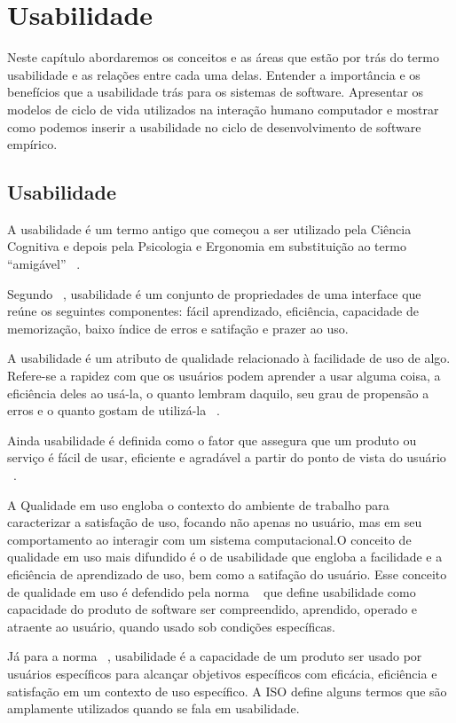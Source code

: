 \chapter{Usabilidade}

	Neste capítulo abordaremos os conceitos e as áreas que estão por trás do termo usabilidade e as relações entre cada uma delas. Entender a importância e os benefícios que a usabilidade trás para os sistemas de software. Apresentar os modelos de ciclo de vida utilizados na interação humano computador e mostrar como podemos inserir a usabilidade no ciclo de desenvolvimento de software empírico.

\section {Usabilidade}

	A usabilidade é um termo antigo que começou a ser utilizado pela Ciência Cognitiva e depois pela Psicologia e Ergonomia em substituição ao termo “amigável” ~\cite{dias2006}.
	
	Segundo ~, usabilidade é um conjunto de propriedades de uma interface que reúne os seguintes componentes: fácil aprendizado, eficiência, capacidade de memorização, baixo índice de erros e satifação e prazer ao uso.

	A usabilidade é um atributo de qualidade relacionado à facilidade de uso de algo. Refere-se a rapidez com que os usuários podem aprender a usar alguma coisa, a eficiência deles ao usá-la, o quanto lembram daquilo, seu grau de propensão a erros e o quanto gostam de utilizá-la ~\cite{nielsen2007}. 
	
	Ainda usabilidade é definida como o fator que assegura que um produto ou serviço é fácil de usar, eficiente e agradável a partir do ponto de vista do usuário ~\cite{preece2007}.
	
	A Qualidade em uso engloba o contexto do ambiente de trabalho para caracterizar a satisfação de uso, focando não apenas no usuário, mas em seu comportamento ao interagir com um sistema computacional.O conceito de qualidade em uso mais difundido é o de usabilidade que engloba a facilidade e a eficiência de aprendizado de uso, bem como a satifação do usuário. Esse conceito de qualidade em uso é defendido pela norma ~ que define usabilidade como  capacidade do produto de software ser compreendido, aprendido, operado e atraente ao usuário, quando usado sob condições específicas.
	
	Já para a norma ~, usabilidade é a capacidade de um produto ser usado por usuários específicos para alcançar objetivos específicos com eficácia, eficiência e satisfação em um contexto de uso específico. A ISO define alguns termos que são amplamente utilizados quando se fala em usabilidade.

